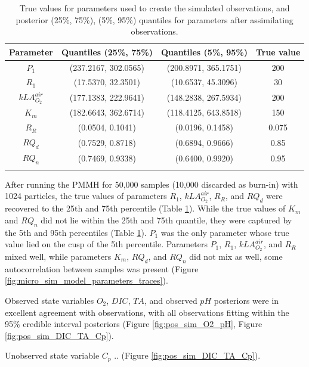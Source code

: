 \documentclass{ruthesis}
\begin{document}
\begin{longtable}{|c|c|c|c|} 
		\hline
		\bfseries{Parameter}  & \bfseries{Quantiles (25\%, 75\%)}  & \bfseries{Quantiles (5\%, 95\%)} &  \bfseries{True value} \\ \hline
		$P_1$ 				& (237.2167, 302.0565) 	& (200.8971, 365.1751) 	&  200  \\ 
		$R_1$ 				& (17.5370, 32.3501) 	& (10.6537, 45.3096)	& 	30 \\ 
		$kLA_{O_2}^{air}$ 	& (177.1383, 222.9641)  & (148.2838, 267.5934)  &  200 \\
		$K_m$ 				& (182.6643, 362.6714) 	& (118.4125, 643.8518) 	&  150 \\ 
		$R_R$ 				& (0.0504, 0.1041) 		& (0.0196, 0.1458) 		& 0.075 \\
		$RQ_d$ 				& (0.7529, 0.8718) 		& (0.6894, 0.9666) 		& 0.85 \\	
		$RQ_n$ 				& (0.7469, 0.9338) 		& (0.6400, 0.9920) 		& 0.95 \\	
		\hline
		\caption[.]{True values for parameters used to create the simulated observations, and posterior (25\%, 75\%), (5\%, 95\%) quantiles for parameters after assimilating observations.}	
		\label{table:micro_parameters_sim}
\end{longtable}

After running the PMMH for 50,000 samples (10,000 discarded as burn-in) with 1024 particles, the true values of parameters $R_1$, $kLA_{O_2}^{air}$, $R_R$, and $RQ_d$ were recovered to the 25th and 75th percentile (Table \ref{table:micro_parameters_sim}). While the true values of $K_m$ and $RQ_n$ did not lie within the 25th and 75th quantile, they were captured by the 5th and 95th percentiles (Table \ref{table:micro_parameters_sim}). $P_1$ was the only parameter whose true value lied on the cusp of the 5th percentile. Parameters $P_1$, $R_1$, $kLA_{O_2}^{air}$, and $R_R$ mixed well, while parameters $K_m$, $RQ_d$, and $RQ_n$ did not mix as well, some autocorrelation between samples was present (Figure \ref{fig:micro_sim_model_parameters_traces}).

Observed state variables $O_2$, $DIC$, $TA$, and observed $pH$ posteriors were in excellent agreement with observations, with all observations fitting within the 95\% credible interval posteriors (Figure \ref{fig:pos_sim_O2_pH}, Figure \ref{fig:pos_sim_DIC_TA_Cp}).


Unobserved state variable $C_p$ .. (Figure \ref{fig:pos_sim_DIC_TA_Cp}).
\end{document}
